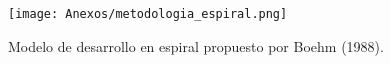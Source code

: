       \begin{figure}[H]
            \centering
            \texttt{[image: Anexos/metodologia\_espiral.png]}
            \caption{Modelo de desarrollo en espiral propuesto por Boehm (1988).}
            \label{fig:modelo_espiral}
      \end{figure}


